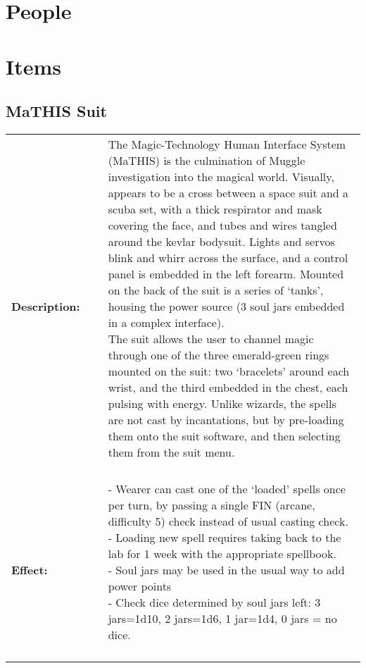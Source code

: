 \documentclass[oneside]{book}
\begin{document}
\section{People}

\section{Items}
\subsection{MaTHIS Suit}


\begin{longtable}{p{} p{} p{} }

\bf Description: & ~ &\parbox[t]{\q cm}{The Magic-Technology Human Interface System (MaTHIS) is the culmination of Muggle investigation into the magical world. Visually, appears to be a cross between a space suit and a scuba set, with a thick respirator and mask covering the face, and tubes and wires tangled around the kevlar bodysuit. Lights and servos blink and whirr across the surface, and a control panel is embedded in the left forearm. Mounted on the back of the suit is a series of `tanks', housing the power source (3 soul jars embedded in a complex interface). \\ The suit allows the user to channel magic through one of the three emerald-green rings mounted on the suit: two `bracelets' around each wrist, and the third embedded in the chest, each pulsing with energy. Unlike wizards, the spells are not cast by incantations, but by pre-loading them onto the suit software, and then selecting them from the suit menu. \\~  } 
\\
\bf Effect:	& ~ & \parbox[t]{\q cm}{- Wearer can cast  one of the `loaded' spells once per turn, by passing a single FIN (arcane, difficulty 5) check instead of usual casting check. \\ -  Loading new spell requires taking back to the lab for 1 week with the appropriate spellbook. \\ - Soul jars may be used in the usual way to add power points \\ - Check dice determined by soul jars left: 3 jars=1d10, 2 jars=1d6, 1 jar=1d4, 0 jars = no dice.   \\~  } 
\end{longtable}
\end{document}
